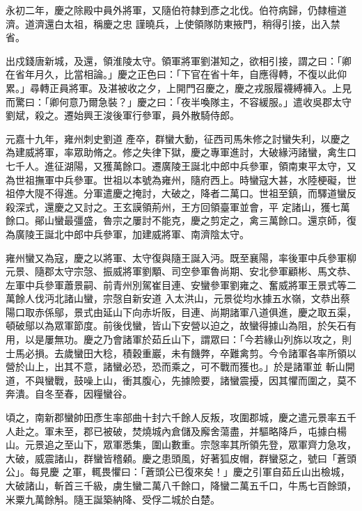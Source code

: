 \begin{pinyinscope}
 永初二年，慶之除殿中員外將軍，又隨伯符隸到彥之北伐。伯符病歸，仍隸檀道濟。道濟還白太祖，稱慶之忠
 謹曉兵，上使領隊防東掖門，稍得引接，出入禁省。



 出戍錢唐新城，及還，領淮陵太守。領軍將軍劉湛知之，欲相引接，謂之曰：「卿在省年月久，比當相論。」慶之正色曰：「下官在省十年，自應得轉，不復以此仰累。」尋轉正員將軍。及湛被收之夕，上開門召慶之，慶之戎服履襪縛褲入。上見而驚曰：「卿何意乃爾急裝？」慶之曰：「夜半喚隊主，不容緩服。」遣收吳郡太守劉斌，殺之。遷始興王浚後軍行參軍，員外散騎侍郎。



 元嘉十九年，雍州刺史劉道
 產卒，群蠻大動，征西司馬朱修之討蠻失利，以慶之為建威將軍，率眾助脩之。修之失律下獄，慶之專軍進討，大破緣沔諸蠻，禽生口七千人。進征湖陽，又獲萬餘口。遷廣陵王誕北中郎中兵參軍，領南東平太守，又為世祖撫軍中兵參軍。世祖以本號為雍州，隨府西上。時蠻寇大甚，水陸梗礙，世祖停大隄不得進。分軍遣慶之掩討，大破之，降者二萬口。世祖至鎮，而驛道蠻反殺深式，還慶之又討之。王玄謨領荊州，王方回領臺軍並會，平
 定諸山，獲七萬餘口。鄖山蠻最彊盛，魯宗之屢討不能克，慶之剪定之，禽三萬餘口。還京師，復為廣陵王誕北中郎中兵參軍，加建威將軍、南濟陰太守。



 雍州蠻又為寇，慶之以將軍、太守復與隨王誕入沔。既至襄陽，率後軍中兵參軍柳元景、隨郡太守宗愨、振威將軍劉顒、司空參軍魯尚期、安北參軍顧彬、馬文恭、左軍中兵參軍蕭景嗣、前青州別駕崔目連、安蠻參軍劉雍之、奮威將軍王景式等二萬餘人伐沔北諸山蠻，宗愨自新安道
 入太洪山，元景從均水據五水嶺，文恭出蔡陽口取赤係鄔，景式由延山下向赤圻阪，目連、尚期諸軍八道俱進，慶之取五渠，頓破鄔以為眾軍節度。前後伐蠻，皆山下安營以迫之，故蠻得據山為阻，於矢石有用，以是屢無功。慶之乃會諸軍於茹丘山下，謂眾曰：「今若緣山列旆以攻之，則士馬必損。去歲蠻田大稔，積穀重巖，未有饑弊，卒難禽剪。今令諸軍各率所領以營於山上，出其不意，諸蠻必恐，恐而乘之，可不戰而獲也。」於是諸軍並
 斬山開道，不與蠻戰，鼓噪上山，衝其腹心，先據險要，諸蠻震擾，因其懼而圍之，莫不奔潰。自冬至春，因糧蠻谷。



 頃之，南新郡蠻帥田彥生率部曲十封六千餘人反叛，攻圍郡城，慶之遣元景率五千人赴之。軍未至，郡已被破，焚燒城內倉儲及廨舍蕩盡，并驅略降戶，屯據白楊山。元景追之至山下，眾軍悉集，圍山數重。宗愨率其所領先登，眾軍齊力急攻，大破，威震諸山，群蠻皆稽顙。慶之患頭風，好著狐皮帽，群蠻惡之，號曰「蒼頭公」。每見慶
 之軍，輒畏懼曰：「蒼頭公已復來矣！」慶之引軍自茹丘山出檢城，大破諸山，斬首三千級，虜生蠻二萬八千餘口，降蠻二萬五千口，牛馬七百餘頭，米粟九萬餘斛。隨王誕築納降、受俘二城於白楚。




\end{pinyinscope}

